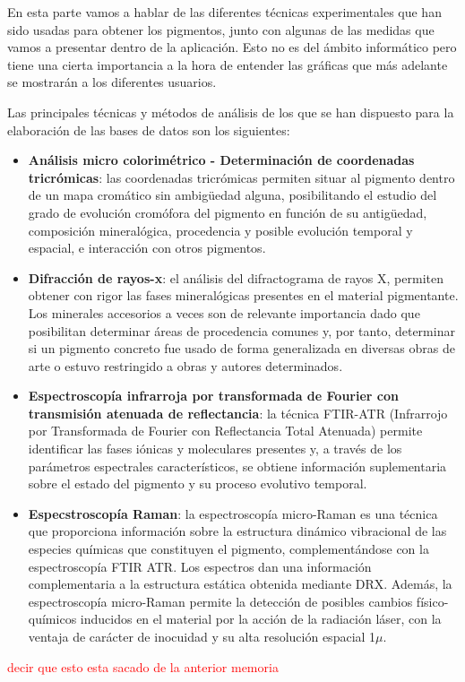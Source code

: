 En esta parte vamos a hablar de las diferentes técnicas experimentales que han sido usadas para obtener los pigmentos, junto con algunas de las medidas que vamos a presentar dentro de la aplicación. Esto no es del ámbito informático pero tiene una cierta importancia a la hora de entender las gráficas que más adelante se mostrarán a los diferentes usuarios. 

Las principales técnicas y métodos de análisis de los que se han dispuesto para la elaboración de las bases de datos son los siguientes:
\begin{itemize}
\item \textbf{Análisis micro colorimétrico - Determinación de coordenadas tricrómicas}: las coordenadas tricrómicas permiten situar al pigmento dentro de un mapa cromático sin ambigüedad alguna, posibilitando el estudio del grado de evolución cromófora del pigmento en función de su antigüedad, composición mineralógica, procedencia y posible evolución temporal y espacial, e interacción con otros pigmentos.
\item \textbf{Difracción de rayos-x}: el análisis del difractograma de rayos X, permiten obtener con rigor las fases mineralógicas presentes en el material pigmentante. Los minerales accesorios a veces son de relevante importancia dado que posibilitan determinar áreas de procedencia comunes y, por tanto, determinar si un pigmento concreto fue usado de forma generalizada en diversas obras de arte o estuvo restringido a obras y autores determinados.
\item \textbf{Espectroscopía infrarroja por transformada de Fourier con transmisión atenuada de reflectancia}: la técnica FTIR-ATR (Infrarrojo por Transformada de Fourier con Reflectancia Total Atenuada) permite identificar las fases iónicas y moleculares presentes y, a través de los parámetros espectrales característicos, se obtiene información suplementaria sobre el estado del pigmento y su proceso evolutivo temporal.
\item \textbf{Especstroscopía Raman}: la espectroscopía micro-Raman es una técnica que proporciona información sobre la estructura dinámico vibracional de las especies químicas que constituyen el pigmento, complementándose con la espectroscopía FTIR ATR. Los espectros dan una información complementaria a la estructura estática obtenida mediante DRX. Además, la espectroscopía micro-Raman permite la detección de posibles cambios físico-químicos inducidos en el material por la acción de la radiación láser, con la ventaja de carácter de inocuidad y su alta resolución espacial 1$\mu$.
\end{itemize}
\textcolor{red}{decir que esto esta sacado de la anterior memoria}